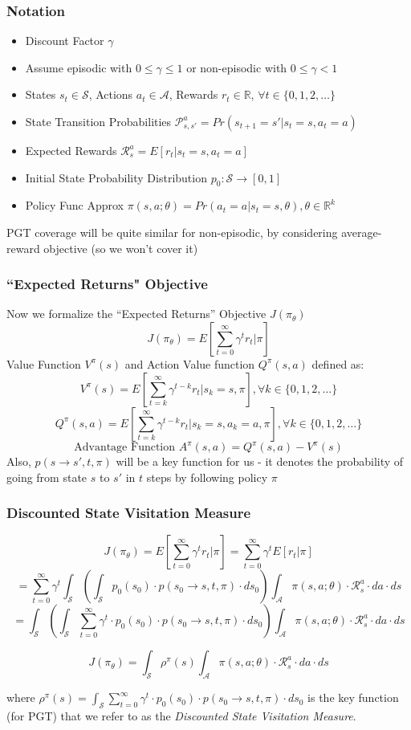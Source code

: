 \documentclass[handout]{beamer}
\begin{document}
\begin{frame}
\frametitle{Notation}
\pause
\begin{itemize}[<+->]
\item Discount Factor $\gamma$
\item Assume episodic with $0 \leq \gamma \leq1$ or non-episodic with $0 \leq \gamma < 1$
\item States $s_t \in \mathcal{S}$, Actions $a_t \in \mathcal{A}$, Rewards $r_t \in \mathbb{R}$, $\forall t \in \{0, 1, 2, \ldots\}$
\item State Transition Probabilities $\mathcal{P}_{s,s'}^a = Pr(s_{t+1}=s'|s_t=s,a_t=a)$
\item Expected Rewards $\mathcal{R}_s^a = E[r_t | s_t=s,a_t=a]$
\item Initial State Probability Distribution $p_0 : \mathcal{S} \rightarrow [0,1]$
\item Policy Func Approx $\pi(s,a;\theta) = Pr(a_t=a | s_t=s,\theta), \theta \in \mathbb{R}^k$
\end{itemize}
\pause
PGT coverage will be quite similar for non-episodic, by considering average-reward objective (so we won't cover it)
\end{frame}

\begin{frame}
\frametitle{``Expected Returns" Objective}
\pause
Now we formalize the ``Expected Returns'' Objective $J(\pi_{\theta})$
$$J(\pi_{\theta}) = E[\sum_{t=0}^\infty \gamma^t r_t|\pi]$$
\pause
Value Function $V^{\pi}(s)$ and Action Value function $Q^{\pi}(s,a)$ defined as:
$$V^{\pi}(s) = E[\sum_{t=k}^\infty \gamma^{t-k} r_t|s_k=s, \pi], \forall k \in \{0, 1, 2, \ldots\}$$
$$Q^{\pi}(s,a) = E[\sum_{t=k}^\infty \gamma^{t-k} r_t|s_k=s, a_k=a, \pi], \forall k \in \{0, 1, 2, \ldots\}$$
\pause
$$\mbox{Advantage Function } A^{\pi}(s,a) = Q^{\pi}(s,a) - V^{\pi}(s)$$
\pause
Also, $p(s \rightarrow s', t, \pi)$ will be a key function for us - it denotes the probability of going from state $s$ to $s'$ in $t$ steps by following policy $\pi$
\end{frame}

\begin{frame}
\frametitle{Discounted State Visitation Measure}
\pause
$$J(\pi_{\theta}) = E[\sum_{t=0}^\infty \gamma^t r_t|\pi] = \sum_{t=0}^\infty \gamma^t E[r_t|\pi]$$
\pause
$$ = \sum_{t=0}^\infty \gamma^t \int_{\mathcal{S}} (\int_{\mathcal{S}}  p_0(s_0) \cdot p(s_0 \rightarrow s, t, \pi) \cdot ds_0) \int_{\mathcal{A}} \pi(s,a; \theta) \cdot \mathcal{R}_s^a \cdot da \cdot ds$$
\pause
$$ =  \int_{\mathcal{S}} (\int_{\mathcal{S}}  \sum_{t=0}^\infty \gamma^t \cdot p_0(s_0) \cdot p(s_0 \rightarrow s, t, \pi) \cdot ds_0) \int_{\mathcal{A}} \pi(s,a; \theta) \cdot \mathcal{R}_s^a \cdot da \cdot ds$$
\pause
\begin{definition}
$$J(\pi_{\theta}) =  \int_{\mathcal{S}} \rho^{\pi}(s) \int_{\mathcal{A}} \pi(s,a; \theta) \cdot \mathcal{R}_s^a \cdot da \cdot ds$$
\end{definition}
\pause
where $\rho^{\pi}(s) = \int_{\mathcal{S}}  \sum_{t=0}^\infty \gamma^t \cdot p_0(s_0) \cdot p(s_0 \rightarrow s, t, \pi) \cdot ds_0$ is the key function (for PGT) that we refer to as the {\em Discounted State Visitation Measure}.
\end{frame}
\end{document}
